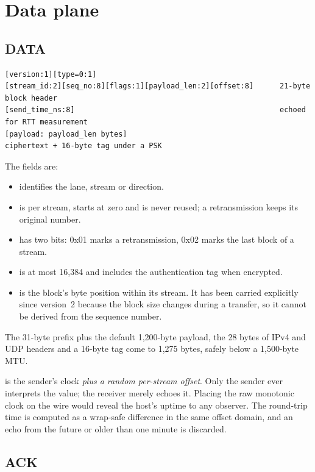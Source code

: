 \section{Data plane}

\subsection{DATA}

\begin{lstlisting}
[version:1][type=0:1]
[stream_id:2][seq_no:8][flags:1][payload_len:2][offset:8]      21-byte block header
[send_time_ns:8]                                               echoed for RTT measurement
[payload: payload_len bytes]                                   ciphertext + 16-byte tag under a PSK
\end{lstlisting}

The fields are:
\begin{itemize}
  \item {} identifies the lane, stream or direction.
  \item {} is per stream, starts at zero and is never reused; a retransmission keeps its original
    number.
  \item {} has two bits: 0x01 marks a retransmission, 0x02 marks the last block of a stream.
  \item {} is at most 16,384 and includes the authentication tag when encrypted.
  \item {} is the block's byte position within its stream. It has been carried explicitly since
    version~2 because the block size changes during a transfer, so it cannot be derived from the sequence
    number.
\end{itemize}

The 31-byte prefix plus the default 1,200-byte payload, the 28 bytes of IPv4 and UDP headers and a 16-byte tag
come to 1,275 bytes, safely below a 1,500-byte MTU.

 is the sender's clock \emph{plus a random per-stream offset}\vviii. Only the sender ever
interprets the value; the receiver merely echoes it. Placing the raw monotonic clock on the wire would reveal
the host's uptime to any observer. The round-trip time is computed as a wrap-safe difference in the same offset
domain, and an echo from the future or older than one minute is discarded.

\subsection{ACK}


